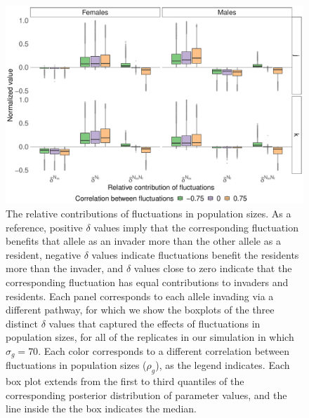\documentclass[12pt]{article}
\begin{document}
\begin{figure}[H]
  \centerline{\includegraphics[width=1\textwidth]{box_plots.pdf}}
  \caption{The relative contributions of fluctuations in population sizes. As a reference, positive $\delta$ values imply that the corresponding fluctuation benefits that allele as an invader more than the other allele as a resident, negative $\delta$ values indicate fluctuations benefit the residents more than the invader, and $\delta$ values close to zero indicate that the corresponding fluctuation has equal contributions to invaders and residents. Each panel corresponds to each allele invading via a different pathway, for which we show the boxplots of the three distinct $\delta$ values that captured the effects of fluctuations in population sizes, for all of the replicates in our simulation in which $\sigma_{g}=70$. Each color corresponds to a different correlation between fluctuations in population sizes ($\rho_{g}$), as the legend indicates. Each box plot extends from the first to third quantiles of the corresponding posterior distribution of parameter values, and the line inside the the box indicates the median.  }
    \label{fig:boxes}
\end{figure}
\end{document}

